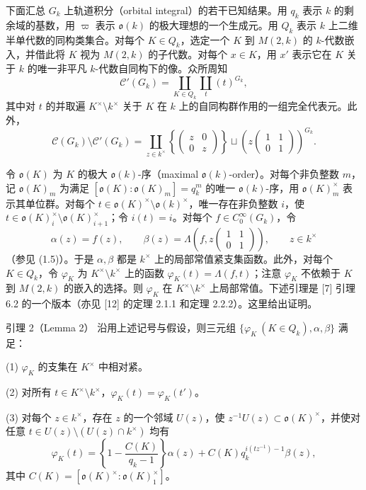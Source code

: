 下面汇总 $G_k$ 上轨道积分（orbital integral）的若干已知结果。用 $q_k$ 表示 $k$ 的剩余域的基数，用 $\varpi$ 表示 $\mathfrak o(k)$ 的极大理想的一个生成元。用 $Q_k$ 表示 $k$ 上二维半单代数的同构类集合。对每个 $K\in Q_k$，选定一个 $K$ 到 $M(2,k)$ 的 $k$-代数嵌入，并借此将 $K$ 视为 $M(2,k)$ 的子代数。对每个 $x\in K$，用 $x'$ 表示它在 $K$ 关于 $k$ 的唯一非平凡 $k$-代数自同构下的像。众所周知
\[
 \mathcal C'(G_k)=\coprod_{K\in Q_k}\coprod_t(t)^{G_k},
\]
其中对 $t$ 的并取遍 $K^\times\setminus k^\times$ 关于 $K$ 在 $k$ 上的自同构群作用的一组完全代表元。此外，
\[
 \mathcal C(G_k)\setminus\mathcal C'(G_k)
 =\coprod_{z\in k^\times}
 \left\{\begin{pmatrix}z&0\\0&z\end{pmatrix}\right\}
 \sqcup\left(z\begin{pmatrix}1&1\\0&1\end{pmatrix}\right)^{G_k}.
\]

令 $\mathfrak o(K)$ 为 $K$ 的极大 $\mathfrak o(k)$-序（maximal $\mathfrak o(k)$-order）。对每个非负整数 $m$，记 $\mathfrak o(K)_m$ 为满足 $[\mathfrak o(K):\mathfrak o(K)_m]=q_k^m$ 的唯一 $\mathfrak o(k)$-序，用 $\mathfrak o(K)_m^\times$ 表示其单位群。对每个 $t\in\mathfrak o(K)^\times\setminus\mathfrak o(k)^\times$，唯一存在非负整数 $i$，使 $t\in\mathfrak o(K)_i^\times\setminus\mathfrak o(K)_{i+1}^\times$；令 $i(t)=i$。对每个 $f\in C_0^\infty(G_k)$，令
\[
 \alpha(z)=f(z),\qquad
 \beta(z)=\Lambda\left(f,z\begin{pmatrix}1&1\\0&1\end{pmatrix}\right),\qquad z\in k^\times
\]
（参见 (1.5)）。于是 $\alpha,\beta$ 都是 $k^\times$ 上的局部常值紧支集函数。此外，对每个 $K\in Q_k$，令 $\varphi_K$ 为 $K^\times\setminus k^\times$ 上的函数 $\varphi_K(t)=\Lambda(f,t)$；注意 $\varphi_K$ 不依赖于 $K$ 到 $M(2,k)$ 的嵌入的选择。则 $\varphi_K$ 在 $K^\times\setminus k^\times$ 上局部常值。下述引理是 [7] 引理 6.2 的一个版本（亦见 [12] 的定理 2.1.1 和定理 2.2.2）。这里给出证明。

\begin{originaltheorem}{引理 2（Lemma 2）}
沿用上述记号与假设，则三元组 $\{\varphi_K\ (K\in Q_k),\alpha,\beta\}$ 满足：

(1) $\varphi_K$ 的支集在 $K^\times$ 中相对紧。

(2) 对所有 $t\in K^\times\setminus k^\times$，$\varphi_K(t)=\varphi_K(t')$。

(3) 对每个 $z\in k^\times$，存在 $z$ 的一个邻域 $U(z)$，使 $z^{-1}U(z)\subset\mathfrak o(K)^\times$，并使对任意 $t\in U(z)\setminus(U(z)\cap k^\times)$ 均有
\begin{equation}
 \varphi_K(t)=\left\{1-\frac{C(K)}{q_k-1}\right\}\alpha(z)
 +C(K)q_k^{i(tz^{-1})-1}\beta(z),
 \tag{2.2}
\end{equation}
其中 $C(K)=[\mathfrak o(K)^\times:\mathfrak o(K)_1^\times]$。
\end{originaltheorem}

